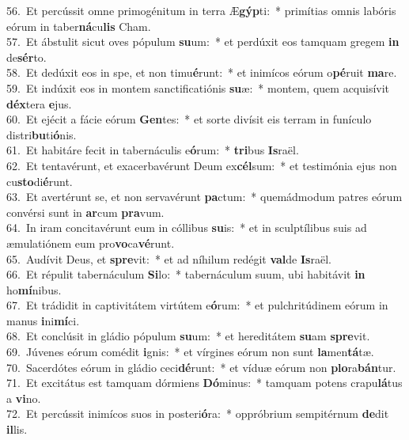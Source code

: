 {56.~}Et percússit omne primogénitum in terra Æ\textbf{gýp}ti:~* primítias omnis labóris eórum in taber\textbf{ná}cu\textbf{lis} Cham.\\
{57.~}Et ábstulit sicut oves pópulum \textbf{su}um:~* et perdúxit eos tamquam gregem \textbf{in} de\textbf{sér}to.\\
{58.~}Et dedúxit eos in spe, et non timu\textbf{é}runt:~* et inimícos eórum o\textbf{pé}ruit \textbf{ma}re.\\
{59.~}Et indúxit eos in montem sanctificatiónis \textbf{su}æ:~* montem, quem acquisívit \textbf{déx}tera \textbf{e}jus.\\
{60.~}Et ejécit a fácie eórum \textbf{Gen}tes:~* et sorte divísit eis terram in funículo distri\textbf{bu}ti\textbf{ó}nis.\\
{61.~}Et habitáre fecit in tabernáculis e\textbf{ó}rum:~* \textbf{tri}bus \textbf{Is}raël.\\
{62.~}Et tentavérunt, et exacerbavérunt Deum ex\textbf{cél}sum:~* et testimónia ejus non cu\textbf{sto}di\textbf{é}runt.\\
{63.~}Et avertérunt se, et non servavérunt \textbf{pa}ctum:~* quemádmodum patres eórum convérsi sunt in \textbf{ar}cum \textbf{pra}vum.\\
{64.~}In iram concitavérunt eum in cóllibus \textbf{su}is:~* et in sculptílibus suis ad æmulatiónem eum pro\textbf{vo}ca\textbf{vé}runt.\\
{65.~}Audívit Deus, et \textbf{spre}vit:~* et ad níhilum redégit \textbf{val}de \textbf{Is}raël.\\
{66.~}Et répulit tabernáculum \textbf{Si}lo:~* tabernáculum suum, ubi habitávit \textbf{in} ho\textbf{mí}nibus.\\
{67.~}Et trádidit in captivitátem virtútem e\textbf{ó}rum:~* et pulchritúdinem eórum in manus \textbf{i}ni\textbf{mí}ci.\\
{68.~}Et conclúsit in gládio pópulum \textbf{su}um:~* et hereditátem \textbf{su}am \textbf{spre}vit.\\
{69.~}Júvenes eórum comédit \textbf{i}gnis:~* et vírgines eórum non sunt \textbf{la}men\textbf{tá}tæ.\\
{70.~}Sacerdótes eórum in gládio ceci\textbf{dé}runt:~* et víduæ eórum non \textbf{plo}ra\textbf{bán}tur.\\
{71.~}Et excitátus est tamquam dórmiens \textbf{Dó}minus:~* tamquam potens crapu\textbf{lá}tus a \textbf{vi}no.\\
{72.~}Et percússit inimícos suos in posteri\textbf{ó}ra:~* oppróbrium sempitérnum \textbf{de}dit \textbf{il}lis.\\
